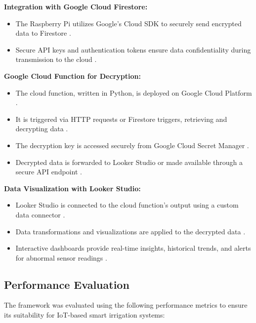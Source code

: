 \documentclass[runningheads]{llncs}
\begin{document}
\textbf{Integration with Google Cloud Firestore:}
\begin{itemize}
    \item The Raspberry Pi utilizes Google's Cloud SDK to securely send encrypted data to Firestore \cite{ref19}.
    \item Secure API keys and authentication tokens ensure data confidentiality during transmission to the cloud \cite{ref22}.
\end{itemize}

\textbf{Google Cloud Function for Decryption:}
\begin{itemize}
    \item The cloud function, written in Python, is deployed on Google Cloud Platform \cite{ref22}.
    \item It is triggered via HTTP requests or Firestore triggers, retrieving and decrypting data \cite{ref23}.
    \item The decryption key is accessed securely from Google Cloud Secret Manager \cite{ref23}.
    \item Decrypted data is forwarded to Looker Studio or made available through a secure API endpoint \cite{ref20}.
\end{itemize}

\textbf{Data Visualization with Looker Studio:}
\begin{itemize}
    \item Looker Studio is connected to the cloud function's output using a custom data connector \cite{ref20}.
    \item Data transformations and visualizations are applied to the decrypted data \cite{ref20}.
    \item Interactive dashboards provide real-time insights, historical trends, and alerts for abnormal sensor readings \cite{ref20}.
\end{itemize}

\subsection{Performance Evaluation}

The framework was evaluated using the following performance metrics to ensure its suitability for IoT-based smart irrigation systems:
\end{document}
